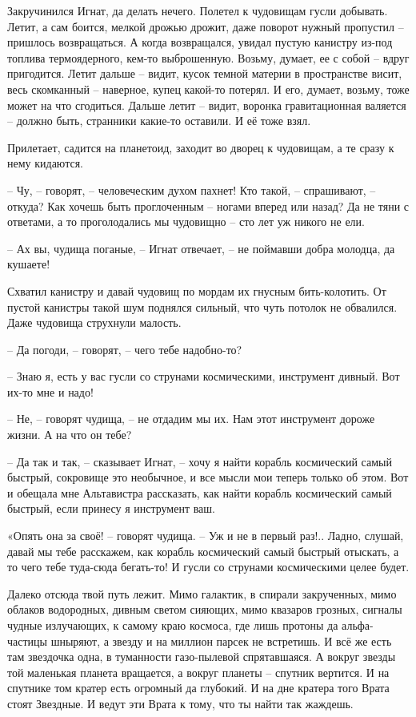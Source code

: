 \documentclass[ebook,oneside,final,openright]{memoir}
\begin{document}
\par
Закручинился Игнат, да делать нечего. Полетел к чудовищам гусли добывать. Летит, а сам боится, мелкой дрожью дрожит, даже поворот нужный пропустил – пришлось возвращаться. А когда возвращался, увидал пустую канистру из-под топлива термоядерного, кем-то выброшенную. Возьму, думает, ее с собой – вдруг пригодится. Летит дальше – видит, кусок темной материи в пространстве висит, весь скомканный – наверное, купец какой-то потерял. И его, думает, возьму, тоже может на что сгодиться. Дальше летит – видит, воронка гравитационная валяется – должно быть, странники какие-то оставили. И её тоже взял.\par
\par
Прилетает, садится на планетоид, заходит во дворец к чудовищам, а те сразу к нему кидаются. \par
– Чу, – говорят, – человеческим духом пахнет! Кто такой, – спрашивают, – откуда? Как хочешь быть проглоченным – ногами вперед или назад? Да не тяни с ответами, а то проголодались мы чудовищно – сто лет уж никого не ели.\par
– Ах вы, чудища поганые, – Игнат отвечает, – не поймавши добра молодца, да кушаете! \par
Схватил канистру и давай чудовищ по мордам их гнусным бить-колотить. От пустой канистры такой шум поднялся сильный, что чуть потолок не обвалился. Даже чудовища струхнули малость. \par
– Да погоди, – говорят, – чего тебе надобно-то?\par
– Знаю я, есть у вас гусли со струнами космическими, инструмент дивный. Вот их-то мне и надо!\par
– Не, – говорят чудища, – не отдадим мы их. Нам этот инструмент дороже жизни. А на что он тебе? \par
– Да так и так, – сказывает Игнат, – хочу я найти корабль космический самый быстрый, сокровище это необычное, и все мысли мои теперь только об этом. Вот и обещала мне Альтавистра рассказать, как найти корабль космический самый быстрый, если принесу я инструмент ваш. \par
\par
«Опять она за своё! – говорят чудища. – Уж и не в первый раз!.. Ладно, слушай, давай мы тебе расскажем, как корабль космический самый быстрый отыскать, а то чего тебе туда-сюда бегать-то! И гусли со струнами космическими целее будет. \par
\par
Далеко отсюда твой путь лежит. Мимо галактик, в спирали закрученных, мимо облаков водородных, дивным светом сияющих, мимо квазаров грозных, сигналы чудные излучающих, к самому краю космоса, где лишь протоны да альфа-частицы шныряют, а звезду и на миллион парсек не встретишь. И всё же есть там звездочка одна, в туманности газо-пылевой спрятавшаяся. А вокруг звезды той маленькая планета вращается, а вокруг планеты – спутник вертится. И на спутнике том кратер есть огромный да глубокий. И на дне кратера того Врата стоят Звездные. И ведут эти Врата к тому, что ты найти так жаждешь.\par
\end{document}
